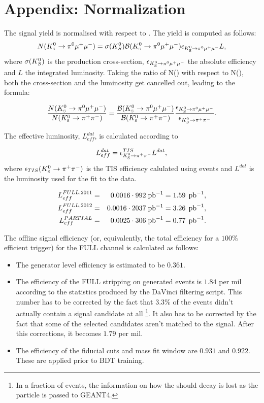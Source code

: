 \clearpage
\newpage
\section{Appendix: Normalization}
\label{app:normalization}

The signal yield is normalised with respect to \Kspipi . The yield is computed as follows:
\begin{equation}
N(K^0_{\mathrm{\scriptscriptstyle S}}\rightarrow\pi^{0}\mu^{+}\mu^{-}) = \sigma(K^{0}_{S}){\cal B}(K^0_{\mathrm{\scriptscriptstyle S}}\rightarrow\pi^{0}\mu^{+}\mu^{-})\epsilon_{K^0_{\mathrm{\scriptscriptstyle S}}\rightarrow\pi^{0}\mu^{+}\mu^{-}} L,
\end{equation}
where $\sigma(K^{0}_{S})$ is the \KS production cross-section, $\epsilon_{K^0_{\mathrm{\scriptscriptstyle S}}\rightarrow\pi^{0}\mu^{+}\mu^{-}}$ the absolute efficiency and $L$ the integrated luminosity. Taking the ratio of N(\KsPzMuMu) with respect to N(\Kspipi), both the 
cross-section and the luminosity get cancelled out, leading to the formula:

\begin{equation}
\frac{N(K^0_{\mathrm{\scriptscriptstyle S}}\rightarrow\pi^{0}\mu^{+}\mu^{-})}{N(K^0_{\mathrm{\scriptscriptstyle S}}\to\pi^+\pi^-)} = \frac{{\cal B}(K^0_{\mathrm{\scriptscriptstyle S}}\rightarrow\pi^{0}\mu^{+}\mu^{-})}{{\cal B}(K^0_{\mathrm{\scriptscriptstyle S}}\to\pi^+\pi^-)} \frac{\epsilon_{K^0_{\mathrm{\scriptscriptstyle S}}\rightarrow\pi^{0}\mu^{+}\mu^{-}}}{\epsilon_{K^{0}_{S}\to\pi^{+}\pi^{-}}}.
\end{equation}

The effective luminosity, $L^{dat}_{eff}$, is calculated according to

\begin{equation}
L^{dat}_{eff} = \epsilon^{TIS}_{K^0_{\mathrm{\scriptscriptstyle S}}\to\pi^+\pi^-}L^{dat}, \\
\end{equation}	
where $\epsilon_{TIS}(K^0_{\mathrm{\scriptscriptstyle S}}\to\pi^+\pi^-)$ is the TIS efficiency calulated using \Kspipi events and $L^{dat}$ is the luminosity used for the fit to the data.

\begin{eqnarray}
L^{FULL,2011}_{eff} &=& 0.0016 \cdot 992\;\rm pb^{-1} = 1.59\;\,{\rm pb}^{-1}, \\
L^{FULL,2012}_{eff} &=& 0.0016 \cdot 2037\;\rm pb^{-1} = 3.26\;\,{\rm pb}^{-1},\\
L^{PARTIAL}_{eff} &=& 0.0025 \cdot 306\;\rm pb^{-1} = 0.77\;\,{\rm pb}^{-1}. 
\end{eqnarray}

The offline signal efficiency (or, equivalently, the total efficiency for a $100\%$ efficient trigger) for the FULL channel is calculated as follows:
\begin{itemize}

\item The generator level efficiency is estimated to be $0.361$. 
\item The efficiency of the FULL stripping on generated events is $1.84$ per mil according to the statistics produced by the DaVinci filtering script. This number has to be corrected by the fact that $3.3\%$ of the events didn't actually contain a signal candidate at all \footnote{In a fraction of events, the information on how the \KS should decay is lost as the particle is passed to GEANT4.}. It also has to be corrected by the fact that some of the selected candidates aren't matched to the signal. After this corrections, it becomes $1.79$ per mil.
\item The efficiency of the fiducial cuts  and mass fit window are $0.931$ and $0.922$. These are applied prior to BDT training.
\end{itemize}

